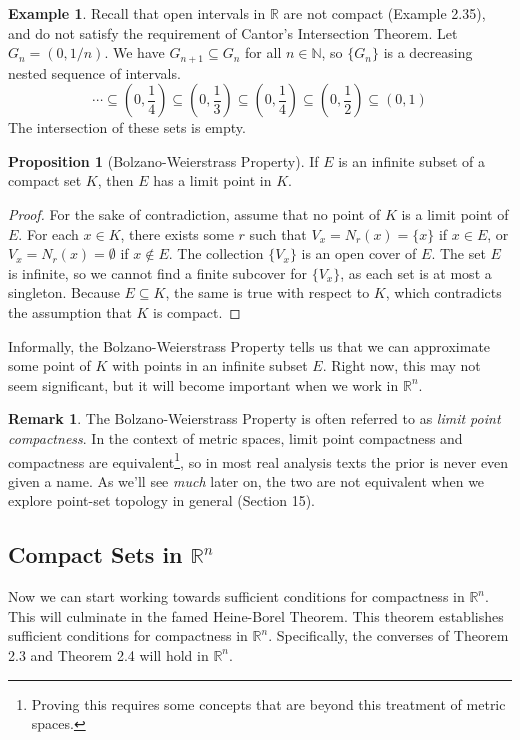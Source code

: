 \documentclass{article}
\newcommand{\N}{\mathbb{N}}
\newcommand{\R}{\mathbb{R}}
\theoremstyle{definition}
\newtheorem{proposition}{Proposition}[section]
\newtheorem{example}{Example}[section]
\newtheorem{remark}{Remark}[section]
\begin{document}
\begin{example}
	Recall that open intervals in $ \R $ are not compact (Example 2.35), and do not satisfy the requirement of Cantor's Intersection Theorem. Let $ G_{n}=(0,1/n) $. We have $ G_{n+1}\subseteq G_{n} $ for all $ n\in\N $, so $ \{G_n\} $ is a decreasing nested sequence of intervals. $$ \cdots\subseteq \left(0,\frac{1}{4}\right)\subseteq\left(0,\frac{1}{3}\right)\subseteq\left(0,\frac{1}{4}\right)\subseteq\left(0,\frac{1}{2}\right)\subseteq(0,1)$$  
The intersection of these sets is empty.	
\end{example}
\begin{proposition}[Bolzano-Weierstrass Property]
	If $ E $ is an infinite subset of a compact set $ K $, then $ E $ has a limit point in $ K $. 
\end{proposition}
\begin{proof}
	For the sake of contradiction, assume that no point of $ K $ is a limit point of $ E $. For each $ x\in K $, there exists some $ r $ such that $ V_x=N_r(x)=\{x\}  $ if $ x\in E $, or $ V_x=N_r(x)=\emptyset $ if $ x\notin E $. The collection $ \{V_x\} $ is an open cover of $ E $. The set $ E $ is infinite, so we cannot find a finite subcover for $ \{V_x\} $, as each set is at most a singleton. Because $ E\subseteq K $, the same is true with respect to $ K $, which contradicts the assumption that $ K $ is compact. 
\end{proof}
Informally, the Bolzano-Weierstrass Property tells us that we can approximate some point of $ K $ with points in an infinite subset $ E $. Right now, this may not seem significant, but it will become important when we work in $ \R^n $. 
\begin{remark}
	The Bolzano-Weierstrass Property is often referred to as \textit{\color{red}limit point compactness}. In the context of metric spaces, limit point compactness and compactness are equivalent\footnote{Proving this requires some concepts that are beyond this treatment of metric spaces.}, so in most real analysis texts the prior is never even given a name. As we'll see \textit{much} later on, the two are not equivalent when we explore point-set topology in general (Section 15).   
\end{remark} 
\subsection{Compact Sets in $ \R^n $}
Now we can start working towards sufficient conditions for compactness in $ \R^n $. This will culminate in the famed Heine-Borel Theorem. This theorem establishes sufficient conditions for compactness in $ \R^n $. Specifically, the converses of Theorem 2.3 and Theorem 2.4 will hold in $ \R^n $.  
\end{document}
